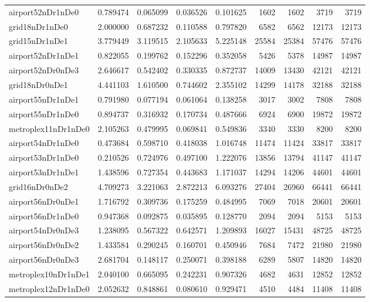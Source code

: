 \begin{longtable}{|l|r|r|r|r|r|r|r|r|}
airport52nDr1nDe0 & 0.789474 & 0.065099 & 0.036526 & 0.101625 & 1602 & 1602 & 3719 & 3719 \\
grid18nDr1nDe0 & 2.000000 & 0.687232 & 0.110588 & 0.797820 & 6582 & 6562 & 12173 & 12173 \\
grid15nDr1nDe1 & 3.779449 & 3.119515 & 2.105633 & 5.225148 & 25584 & 25384 & 57476 & 57476 \\
airport52nDr1nDe1 & 0.822055 & 0.199762 & 0.152296 & 0.352058 & 5426 & 5378 & 14987 & 14987 \\
airport52nDr0nDe3 & 2.646617 & 0.542402 & 0.330335 & 0.872737 & 14009 & 13430 & 42121 & 42121 \\
grid18nDr0nDe1 & 4.441103 & 1.610500 & 0.744602 & 2.355102 & 14299 & 14178 & 32188 & 32188 \\
airport55nDr1nDe1 & 0.791980 & 0.077194 & 0.061064 & 0.138258 & 3017 & 3002 & 7808 & 7808 \\
airport55nDr1nDe0 & 0.894737 & 0.316932 & 0.170734 & 0.487666 & 6924 & 6900 & 19872 & 19872 \\
metroplex11nDr1nDe0 & 2.105263 & 0.479995 & 0.069841 & 0.549836 & 3340 & 3330 & 8200 & 8200 \\
airport54nDr1nDe0 & 0.473684 & 0.598710 & 0.418038 & 1.016748 & 11474 & 11424 & 33817 & 33817 \\
airport53nDr1nDe0 & 0.210526 & 0.724976 & 0.497100 & 1.222076 & 13856 & 13794 & 41147 & 41147 \\
airport53nDr1nDe1 & 1.438596 & 0.727354 & 0.443683 & 1.171037 & 14294 & 14206 & 44601 & 44601 \\
grid16nDr0nDe2 & 4.709273 & 3.221063 & 2.872213 & 6.093276 & 27404 & 26960 & 66441 & 66441 \\
airport56nDr0nDe1 & 1.716792 & 0.309736 & 0.175259 & 0.484995 & 7069 & 7018 & 20601 & 20601 \\
airport56nDr1nDe0 & 0.947368 & 0.092875 & 0.035895 & 0.128770 & 2094 & 2094 & 5153 & 5153 \\
airport54nDr0nDe3 & 1.238095 & 0.567322 & 0.642571 & 1.209893 & 16027 & 15431 & 48725 & 48725 \\
airport56nDr0nDe2 & 1.433584 & 0.290245 & 0.160701 & 0.450946 & 7684 & 7472 & 21980 & 21980 \\
airport56nDr0nDe3 & 2.681704 & 0.148117 & 0.250071 & 0.398188 & 6289 & 5807 & 14820 & 14820 \\
metroplex10nDr1nDe1 & 2.040100 & 0.665095 & 0.242231 & 0.907326 & 4682 & 4631 & 12852 & 12852 \\
metroplex12nDr1nDe0 & 2.052632 & 0.848861 & 0.080610 & 0.929471 & 4510 & 4484 & 11408 & 11408 \\

\end{longtable}
